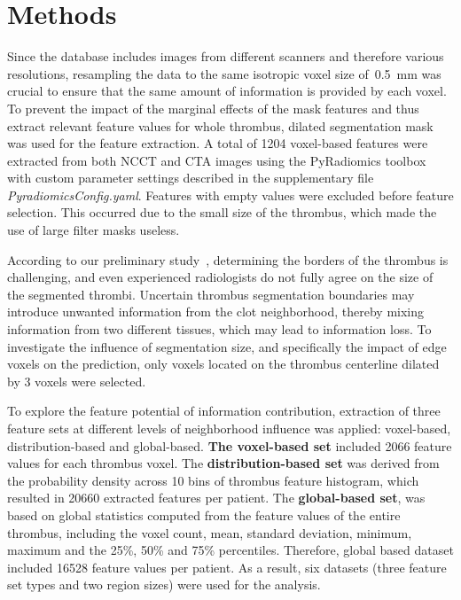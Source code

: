 \documentclass[preprint,12pt]{elsarticle}
\begin{document}
\section{Methods}
Since the database includes images from different scanners and therefore various resolutions, resampling the data to the same isotropic voxel size of~0.5~mm was crucial to ensure that the same amount of information is provided by each voxel. To prevent the impact of the marginal effects of the mask features and thus extract relevant feature values for whole thrombus, dilated segmentation mask was used for the feature extraction. A total of 1204 voxel-based features were extracted from both NCCT and CTA images using the PyRadiomics toolbox~\cite{VanGriethuysen20171031} with custom parameter settings described in the supplementary file \textit{PyradiomicsConfig.yaml}. Features with empty values were excluded before feature selection. This occurred due to the small size of the thrombus, which made the use of large filter masks useless. 

According to our preliminary study~\cite{Nemcekova2024}, determining the borders of the thrombus is challenging, and even experienced radiologists do not fully agree on the size of the segmented thrombi. Uncertain thrombus segmentation boundaries may introduce unwanted information from the clot neighborhood, thereby mixing information from two different tissues, which may lead to information loss. To investigate the influence of segmentation size, and specifically the impact of edge voxels on the prediction, only voxels located on the thrombus centerline dilated by 3 voxels were selected. 

To explore the feature potential of information contribution, extraction of three feature sets at different levels of neighborhood influence was applied: voxel-based, distribution-based and global-based. \textbf{The voxel-based set} included 2066 feature values for each thrombus voxel. The \textbf{distribution-based set} was derived from the probability density across 10 bins of thrombus feature histogram, which resulted in 20660 extracted features per patient. The \textbf{global-based set}, was based on global statistics computed from the feature values of the entire thrombus, including the voxel count, mean, standard deviation, minimum, maximum and the 25\%, 50\% and 75\% percentiles. Therefore, global based dataset included 16528 feature values per patient. As a result, six datasets (three feature set types and two region sizes) were used for the analysis.  
\end{document}
